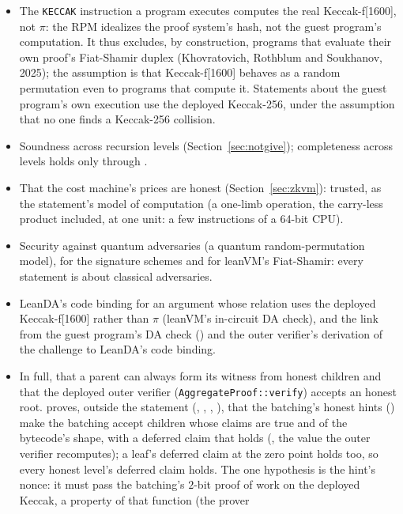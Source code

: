 \documentclass[11pt]{article}
\begin{document}
\begin{itemize}
\item The \texttt{KECCAK} instruction a program executes computes the real Keccak-f[1600], not
$\pi$: the RPM idealizes the proof system's hash, not the guest program's computation. It thus
excludes, by construction, programs that evaluate their own proof's Fiat-Shamir duplex
(Khovratovich, Rothblum and Soukhanov, 2025); the assumption is that Keccak-f[1600] behaves as a
random permutation even to programs that compute it. Statements
about the guest program's own execution use the deployed Keccak-256, under the assumption that no
one finds a Keccak-256 collision.
\item Soundness across recursion levels (Section~\ref{sec:notgive}); completeness across levels
holds only through .
\item That the cost machine's prices are honest (Section~\ref{sec:zkvm}): trusted, as the
statement's model of computation (a one-limb operation, the carry-less product included, at one
unit: a few instructions of a 64-bit CPU).
\item Security against quantum adversaries (a quantum random-permutation model), for the
signature schemes and for leanVM's Fiat-Shamir: every statement is about classical adversaries.
\item LeanDA's code binding for an argument whose relation uses the deployed Keccak-f[1600] rather than $\pi$ (leanVM's in-circuit DA check), and the link from the guest
program's DA check () and the outer verifier's derivation of the challenge to
LeanDA's code binding.
\item In full, that a parent can always form its witness from honest children and that the deployed
outer verifier (\texttt{AggregateProof::verify}) accepts an honest root.  proves,
outside the statement (,
, ,
), that the batching's honest hints
() make the batching accept children whose claims are true and
of the bytecode's shape, with a deferred claim that holds (,
the value the outer verifier recomputes); a leaf's deferred claim at the zero point holds too, so
every honest level's deferred claim holds. The one hypothesis is the hint's nonce: it must pass the
batching's $2$-bit proof of work on the deployed Keccak, a property of that function (the prover

\end{itemize}
\end{document}
